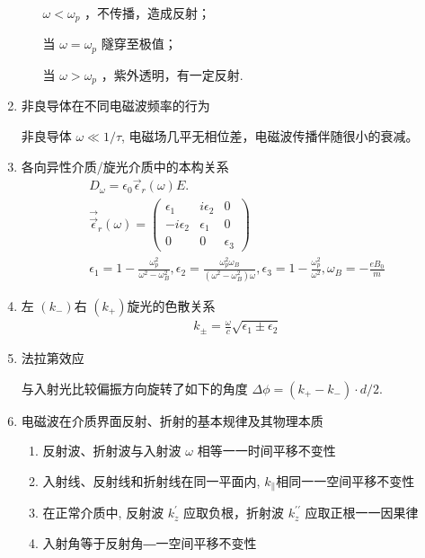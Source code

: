 \documentclass[../../note.tex]{subfiles}
\begin{document}
\begin{enumerate}
\begin{enumerate}
		$\omega<\omega_p$ ，不传播，造成反射；
		
		当 $\omega=\omega_p$ 隧穿至极值；
		
		当 $\omega>\omega_p$ ，紫外透明，有一定反射.
	\end{enumerate}
	\item 非良导体在不同电磁波频率的行为
	
	非良导体 $\omega \ll 1 / \tau$, 电磁场几平无相位差，电磁波传播伴随很小的衰减。
	
	\item 各向异性介质/旋光介质中的本构关系
	\begin{align}
		{D}_\omega=\epsilon_0 \vec{\epsilon}_r(\omega) {E} . \\
		\overrightarrow{\vec{\epsilon}}_r(\omega)=\left(\begin{array}{ccc}
			\epsilon_1 & i \epsilon_2 & 0 \\
			-i \epsilon_2 & \epsilon_1 & 0 \\
			0 & 0 & \epsilon_3
		\end{array}\right) \\
		\epsilon_1=1-\frac{\omega_p^2}{\omega^2-\omega_B^2}, \epsilon_2=\frac{\omega_p^2 \omega_B}{\left(\omega^2-\omega_B^2\right) \omega}, \epsilon_3=1-\frac{\omega_p^2}{\omega^2}, \omega_B=-\frac{e B_0}{m}
	\end{align}
	\item 左 $\left(k_{-}\right)$右 $\left(k_{+}\right)$旋光的色散关系
		\begin{align}
	k_{ \pm}=\frac{\omega}{c} \sqrt{\epsilon_1 \pm \epsilon_2}
	\end{align}
	\item 法拉第效应
	
	与入射光比较偏振方向旋转了如下的角度 $\Delta \phi=\left(k_{+}-k_{-}\right) \cdot d / 2$.
	\item 电磁波在介质界面反射、折射的基本规律及其物理本质
	\begin{enumerate}
    
		\item 反射波、折射波与入射波 $\omega$ 相等一一时间平移不变性
		
		\item 入射线、反射线和折射线在同一平面内, $k_{\|}$相同一一空间平移不变性
		
		\item 在正常介质中, 反射波 $k_z^{\prime}$ 应取负根，折射波 $k_z^{\prime \prime}$ 应取正根一一因果律 
		\item 入射角等于反射角―一空间平移不变性
		

\end{enumerate}
\end{enumerate}
\end{document}
